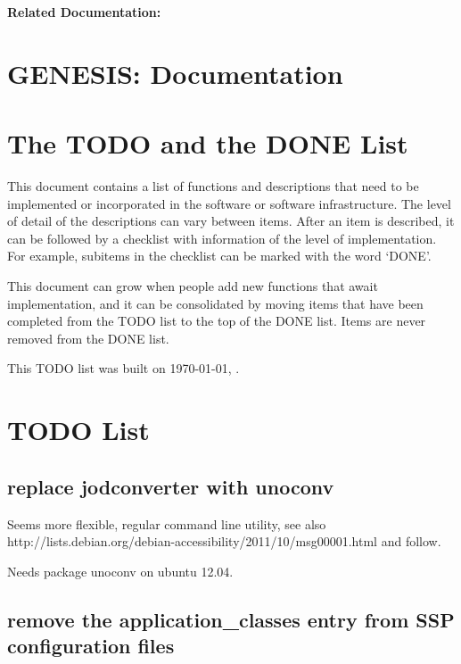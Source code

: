 \documentclass[12pt]{article}
\begin{document}
{\bf Related Documentation:}

\section*{GENESIS: Documentation}

\section{The TODO and the DONE List}

This document contains a list of functions and descriptions that need
to be implemented or incorporated in the software or software
infrastructure.  The level of detail of the descriptions can vary
between items.  After an item is described, it can be followed by a
checklist with information of the level of implementation.  For
example, subitems in the checklist can be marked with the word `DONE'.

This document can grow when people add new functions that await
implementation, and it can be consolidated by moving items that have
been completed from the TODO list to the top of the DONE list.  Items
are never removed from the DONE list.

This TODO list was built on \today, \thistime.


\section{TODO List}


\subsection{replace jodconverter with unoconv}

Seems more flexible, regular command line utility, see also
http://lists.debian.org/debian-accessibility/2011/10/msg00001.html and
follow.

Needs package unoconv on ubuntu 12.04.


\subsection{remove the application\_classes entry from SSP configuration files}
\end{document}
